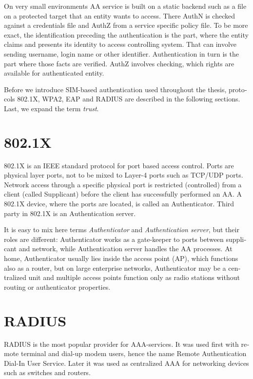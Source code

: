 \documentclass[12pt,a4paper,english]{tutthesis}
\begin{document}
\begin{otherlanguage}{english}
On very small environments AA service is built on a static backend such
as a file on a protected target that an entity wants to access. There AuthN
is checked against a credentials file and AuthZ from a service
specific policy file. 
To be more exact, the identification preceding the authentication is the part,
where the entity claims and presents its identity to 
access controlling system. That can involve sending username, login
name or other identifier. Authentication in turn is the part where
those facts are verified. AuthZ involves checking, which rights are 
available for authenticated entity. 


Before we introduce SIM-based authentication used throughout the
thesis, protocols 802.1X, WPA2, EAP and RADIUS are described in the
following sections. Last, we expand the term \emph{trust}.

\section{802.1X}
\label{sec-2-1}

802.1X\cite{8021X} is an IEEE standard protocol for port based access
control. Ports are physical layer ports, not to be mixed to Layer-4 ports such as TCP/UDP ports.
 Network access through a specific physical port is
restricted (controlled) from a client (called Supplicant) before
the client has successfully performed an AA. A 802.1X device, where
the ports are located, is called an Authenticator. Third party in 802.1X is an
Authentication server. 



It is easy to mix here terms \emph{Authenticator} and \emph{Authentication
server}, but their roles are different: Authenticator works as a
gate-keeper to ports between supplicant and network, while
Authentication server handles the AA processes.
At home, Authenticator usually lies inside the access point (AP),
which functions also as a router, but 
on large enterprise networks, Authenticator may be a centralized unit 
and multiple access points function only as radio stations without
routing or authenticator properties.



\section{RADIUS}
\label{sec-2-2}
\label{sec:radius}
RADIUS is the most popular provider for 
AAA-services\cite[p.75]{radius-popular}.  It was used first with remote terminal
and dial-up modem users, hence the name Remote Authentication Dial-In
User Service. Later it was used as centralized AAA for networking
devices such as switches and routers.  











\end{otherlanguage}
\end{document}
